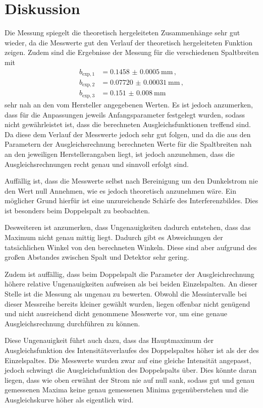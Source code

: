 \section{Diskussion}
\label{sec:Diskussion}
Die Messung spiegelt die theoretisch hergeleiteten Zusammenhänge sehr gut wieder,
da die Messwerte gut den Verlauf der theoretisch hergeleiteten Funktion zeigen. Zudem
sind die Ergebnisse der Messung für die verschiedenen Spaltbreiten mit
\begin{align*}
  b_{\text{exp},1}&=\SI{0.1458(00005)}{\milli\meter} \,, \\
  b_{\text{exp},2}&=\SI{0.07720(000031)}{\milli\meter} \,,\\
  b_{\text{exp},3}&=\SI{0.151(0008)}{\milli\meter} \,
\end{align*}
sehr nah an den vom Hersteller angegebenen Werten.
Es ist jedoch anzumerken, dass für die Anpassungen jeweils Anfangsparameter festgelegt
wurden, sodass nicht gewährleistet ist, dass die berechneten Ausgleichsfunktionen
treffend sind. Da diese dem Verlauf der Messwerte jedoch sehr gut folgen, und da
die aus den Parametern der Ausgleichsrechnung berechneten Werte für die Spaltbreiten
nah an den jeweiligen Herstellerangaben liegt, ist jedoch
anzunehmen, dass die Ausgleichsrechnungen recht genau und sinnvoll erfolgt sind.

Auffällig ist, dass die Messwerte selbst nach Bereinigung um den Dunkelstrom nie
den Wert null Annehmen, wie es jedoch  theoretisch anzunehmen wäre. Ein möglicher Grund
hierfür ist eine unzureichende Schärfe des Interferenzbildes. Dies ist besonders beim
Doppelspalt zu beobachten.

Desweiteren ist anzumerken, dass Ungenauigkeiten dadurch entstehen, dass das Maximum
nicht genau mittig liegt. Dadurch gibt es Abweichungen der tatsächlichen Winkel
von den berechneten Winkeln. Diese sind aber aufgrund des großen Abstandes zwischen
Spalt und Detektor sehr gering.

Zudem ist auffällig, dass beim Doppelspalt die Parameter der Ausgleichrechnung höhere
relative Ungenauigkeiten aufweisen als bei beiden Einzelspalten.
An dieser Stelle ist die Messung als ungenau zu bewerten. Obwohl die Messintervalle
bei dieser Messreihe bereits kleiner gewählt wurden, liegen offenbar nicht genügend
und nicht ausreichend dicht genommene Messwerte vor, um eine genaue Ausgleichsrechnung durchführen zu können.

Diese Ungenauigkeit führt auch dazu, dass das Hauptmaximum der Ausgleichsfunktion des Intensitätsverlaufes des
Doppelspaltes höher ist als der des Einzelspaltes. Die Messwerte wurden zwar auf
eine gleiche Intensität angepasst, jedoch schwingt die Ausgleichsfunktion des Doppelspalts
über. Dies könnte daran liegen, dass wie oben erwähnt der Strom nie auf null sank, sodass
gut und genau gemessenen Maxima keine genau gemessenen Minima gegenüberstehen und
die Ausgleichskurve höher als eigentlich wird.
